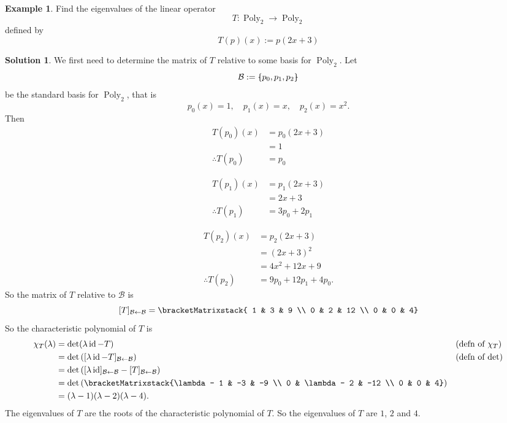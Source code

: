 \documentclass[a4paper,11pt]{book}
\theoremstyle{definition}
\newtheorem{example_environment}{Example}[chapter]
\newtheorem*{solution}{Solution}
\newcommand{\basis}[1]{{\mathcal #1}}
\newcommand{\cmatrix}[1]{\bracketMatrixstack{#1}}
\newenvironment{example}
	{
		\begin{oframed} 
		\begin{example_environment}
	}
	{
		\end{example_environment}
		\end{oframed}
	}
\newcommand{\bmark}{\raisebox{.53ex}{\rule{.2em}{.1ex}}}
\newcommand{\bopen}{{\protect\ooalign{\{\cr\hfil\bmark\hfil\cr}}}
\newcommand{\bclose}{{\protect\ooalign{\}\cr\hfil\bmark\hfil\cr}}}
\DeclareMathOperator{\Poly}{Poly}
\DeclareMathOperator{\id}{id}
\begin{document}
\begin{example} \label{poly-example-eigenvalue} Find the eigenvalues of the linear operator
\[
 T : \Poly_2 \rightarrow \Poly_2
\]
defined by
\[
 T(p)(x) := p(2x+3)
\]
\begin{solution} We first need to determine the matrix of $T$ relative to some basis for $\Poly_2$. Let 
\[
 \basis{B} := \bopen p_0, p_1, p_2 \bclose
\]
be the standard basis for $\Poly_2$, that is
\[
 p_0(x) = 1, \quad p_1(x) = x, \quad p_2(x) = x^2.
\]
Then
\begin{align}
 T(p_0)(x) &= p_0 (2x+3) \nonumber  \\
  &= 1 \nonumber  \\
  \therefore T(p_0) &= p_0 \label{Tp0} 
\end{align}

\begin{align}
 T(p_1)(x) &= p_1 (2x+3) \nonumber \\
  &= 2x+3  \nonumber  \\
  \therefore T(p_1) &= 3p_0 + 2p_1 \label{Tp1}
\end{align}

\begin{align}
 T(p_2)(x) &= p_2 (2x+3) \nonumber  \\
  &= (2x+3)^2 \nonumber  \\
  &= 4x^2 + 12x + 9 \nonumber \\
  \therefore T(p_2) &= 9p_0 + 12p_1 + 4p_0. \label{Tp2}
\end{align}
So the matrix of $T$ relative to $\basis{B}$ is
\[
 [T]_{\basis{B} \leftarrow \basis{B}} = \cmatrix{ 1 & 3 & 9 \\ 0 & 2 & 12 \\ 0 & 0 & 4}
\]
So the characteristic polynomial of $T$ is
\begin{align}
  \chi_T (\lambda) &= \det(\lambda \id - T) && \mbox{(defn of $\chi_T$)} \\
   &= \det \left([\lambda \id - T]_{\basis{B} \leftarrow \basis{B}} \right) && \mbox{(defn of $\det$)} \\
   &= \det \left( [\lambda \id]_{\basis{B} \leftarrow \basis{B}} - [T]_{\basis{B} \leftarrow \basis{B}} \right) \\
   &= \det \left( {\cmatrix{\lambda - 1 & -3 & -9 \\ 0 & \lambda - 2 & -12 \\ 0 & 0 & 4}} \right) \\
   &= (\lambda - 1)(\lambda - 2)(\lambda - 4).
\end{align}
The eigenvalues of $T$ are the roots of the characteristic polynomial of $T$. So the eigenvalues of $T$ are $1$, $2$ and $4$.
\end{solution}
\end{example}
\end{document}
